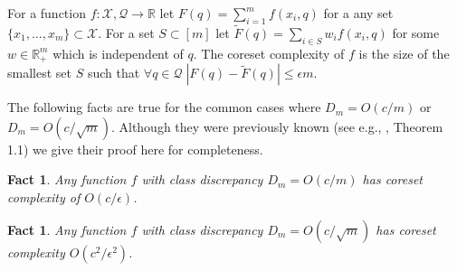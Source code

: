\documentclass[12pt]{colt2019} %
\newtheorem{fact}[theorem]{Fact}
\newcommand{\R}{\mathbb{R}}
\newcommand{\eps}{\epsilon}
\newcommand{\X}{\mathcal{X}}
\newcommand{\Q}{\mathcal{Q}}
\begin{document}
\begin{definition}  
For a function $f:\X,\Q\rightarrow \R$ let $F(q) = \sum_{i=1}^{m} f(x_i,q)$ for a any set $\{x_1,\ldots,x_m\} \subset \X$.
For a set $S \subset [m]$ let $\tilde F(q) = \sum_{i \in S}w_i f(x_i,q)$ for some $w\in\R_+^m$ which is independent of $q$.
The coreset complexity of $f$ is the size of the smallest set $S$ such that $\forall q \in \Q \; |F(q)  - \tilde F(q)| \le \eps m$.
\end{definition}
\noindent The following facts are true for the common cases where $D_m = O(c/m)$ or $D_m = O(c/\sqrt{m})$. Although they were previously known (see e.g., \cite{phillips2009small}, Theorem 1.1) we give their proof here for completeness.
\begin{fact}\label{fct:eps1}
Any function $f$ with class discrepancy $D_m = O(c/m)$ has coreset complexity of $O(c/\eps)$.
\end{fact}
\begin{fact}\label{fct:eps2}
Any function $f$ with class discrepancy $D_m = O(c/\sqrt{m})$ has coreset complexity $O(c^2/\eps^2)$.
\end{fact}
\end{document}
